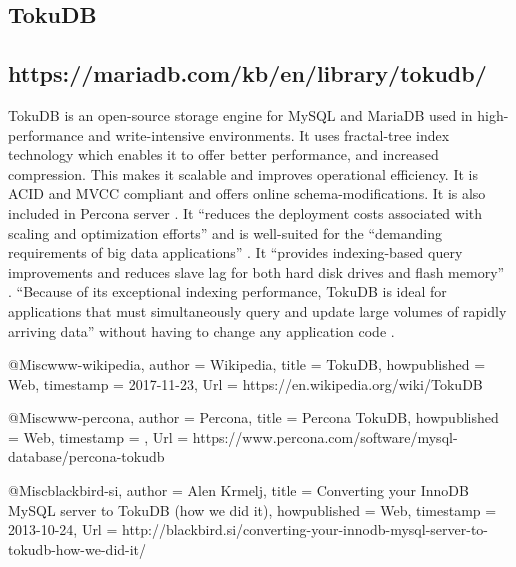 \subsection{TokuDB}
\subsection{https://mariadb.com/kb/en/library/tokudb/}
 
TokuDB is an open-source storage engine for MySQL and MariaDB used in high-performance and write-intensive environments. It uses fractal-tree index technology which enables it to offer better performance, and increased compression. This makes it scalable and improves operational efficiency. It is ACID and MVCC compliant and offers online schema-modifications. It is also included in Percona server \cite{www-wikipedia}. It “reduces the deployment costs associated with scaling and optimization efforts” and is well-suited for the “demanding requirements of big data applications” \cite{www-percona}. It “provides indexing-based query improvements and reduces slave lag for both hard disk drives and flash memory” \cite{www-wikipedia}. “Because of its exceptional indexing performance, TokuDB is ideal for applications that must simultaneously query and update large volumes of rapidly arriving data” without having to change any application code \cite{blackbird-si}.
 
@Misc{www-wikipedia,
  author = {Wikipedia},
  title        = {TokuDB},
  howpublished = {Web},
  timestamp    = {2017-11-23},
  Url = {https://en.wikipedia.org/wiki/TokuDB}
}
 
@Misc{www-percona,
  author = {Percona},
  title        = {Percona TokuDB},
  howpublished = {Web},
  timestamp    = {},
  Url = {https://www.percona.com/software/mysql-database/percona-tokudb}
}
 
@Misc{blackbird-si,
  author = {Alen Krmelj},
  title        = {Converting your InnoDB MySQL server to TokuDB (how we did it)},
  howpublished = {Web},
  timestamp    = {2013-10-24},
  Url = {http://blackbird.si/converting-your-innodb-mysql-server-to-tokudb-how-we-did-it/}
}

